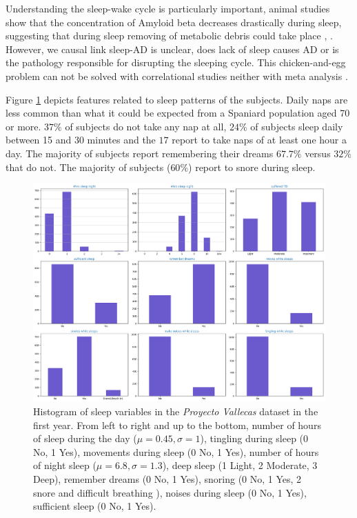 \documentclass[11pt]{article}
\theoremstyle{definition}
\theoremstyle{remark}
\begin{document}
Understanding the sleep-wake cycle is particularly important, animal studies show that the concentration of Amyloid beta decreases drastically during sleep, suggesting that during sleep removing of metabolic debris could take place \cite{kang2009amyloid}, \cite{xie2013sleep}. However, we causal link sleep-AD is unclear, does lack of sleep causes AD or is the pathology  responsible for disrupting the sleeping cycle. 
This chicken-and-egg problem can not be solved with correlational studies neither with meta analysis \cite{bubu2016sleep}.

Figure \ref{fig:sleep} depicts features related to sleep patterns of the subjects. Daily naps are less common than what it could be expected from a Spaniard population aged 70 or more. $37\%$ of subjects do not take any nap at all, $24\%$ of subjects sleep daily between 15 and 30 minutes and the $17$ report to take naps of at least one hour a day. The majority of subjects report remembering their dreams $67.7\%$ versus $32\%$ that do not. The majority of subjects ($60\%$) report to snore during sleep. 
\begin{figure}[H]
        \centering
        \includegraphics[keepaspectratio, width=\linewidth]{figures/Fig_sleep}
        \caption{Histogram of sleep variables in the \emph{Proyecto Vallecas} dataset in the first year. From left to right and up to the bottom, number of hours of sleep during the day ($\mu=0.45, \sigma=1$), tingling during sleep (0 No, 1 Yes), movements during sleep (0 No, 1 Yes), number of hours of night sleep ($\mu=6.8, \sigma=1.3$), deep sleep (1 Light, 2 Moderate, 3 Deep), remember dreams (0 No, 1 Yes), snoring (0 No, 1 Yes, 2 snore and difficult breathing ), noises during sleep (0 No, 1 Yes), sufficient sleep (0 No, 1 Yes).} 
        \label{fig:sleep}
\end{figure}
\end{document}
